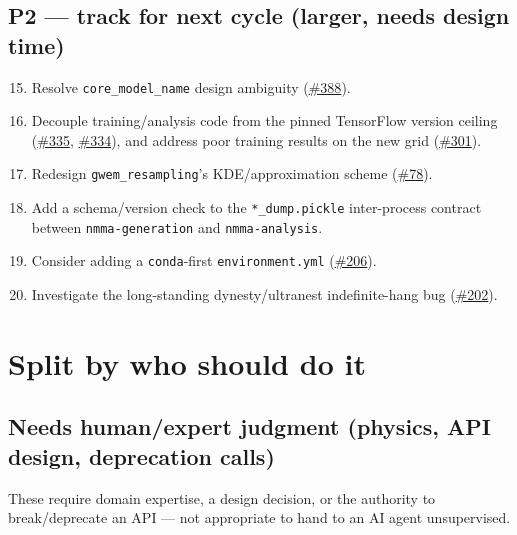 \documentclass[10pt]{article}
\newcommand{\code}[1]{\texttt{#1}}
\begin{document}
\subsection*{P2 --- track for next cycle (larger, needs design time)}
\begin{enumerate}
\setcounter{enumi}{14}
\item Resolve \code{core\_model\_name} design ambiguity (\href{https://github.com/nuclear-multimessenger-astronomy/nmma/issues/388}{\#388}).
\item Decouple training/analysis code from the pinned TensorFlow version ceiling
  (\href{https://github.com/nuclear-multimessenger-astronomy/nmma/issues/335}{\#335}, \href{https://github.com/nuclear-multimessenger-astronomy/nmma/issues/334}{\#334}), and address poor training results on the new grid (\href{https://github.com/nuclear-multimessenger-astronomy/nmma/issues/301}{\#301}).
\item Redesign \code{gwem\_resampling}'s KDE/approximation scheme (\href{https://github.com/nuclear-multimessenger-astronomy/nmma/issues/78}{\#78}).
\item Add a schema/version check to the \code{*\_dump.pickle} inter-process
  contract between \code{nmma-generation} and \code{nmma-analysis}.
\item Consider adding a \code{conda}-first \code{environment.yml} (\href{https://github.com/nuclear-multimessenger-astronomy/nmma/issues/206}{\#206}).
\item Investigate the long-standing dynesty/ultranest indefinite-hang bug
  (\href{https://github.com/nuclear-multimessenger-astronomy/nmma/issues/202}{\#202}).
\end{enumerate}

\section{Split by who should do it}

\subsection{Needs human/expert judgment (physics, API design, deprecation calls)}
These require domain expertise, a design decision, or the authority to
break/deprecate an API --- not appropriate to hand to an AI agent unsupervised.
\end{document}
